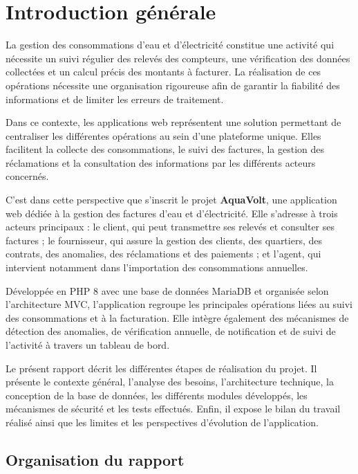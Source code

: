 
\chapter*{Introduction générale}

La gestion des consommations d'eau et d'électricité constitue une activité qui nécessite un suivi régulier des relevés des compteurs, une vérification des données collectées et un calcul précis des montants à facturer. La réalisation de ces opérations nécessite une organisation rigoureuse afin de garantir la fiabilité des informations et de limiter les erreurs de traitement.

Dans ce contexte, les applications web représentent une solution permettant de centraliser les différentes opérations au sein d'une plateforme unique. Elles facilitent la collecte des consommations, le suivi des factures, la gestion des réclamations et la consultation des informations par les différents acteurs concernés.

C'est dans cette perspective que s'inscrit le projet \textbf{AquaVolt}, une application web dédiée à la gestion des factures d'eau et d'électricité. Elle s'adresse à trois acteurs principaux : le client, qui peut transmettre ses relevés et consulter ses factures ; le fournisseur, qui assure la gestion des clients, des quartiers, des contrats, des anomalies, des réclamations et des paiements ; et l'agent, qui intervient notamment dans l'importation des consommations annuelles.

Développée en PHP 8 avec une base de données MariaDB et organisée selon l'architecture MVC, l'application regroupe les principales opérations liées au suivi des consommations et à la facturation. Elle intègre également des mécanismes de détection des anomalies, de vérification annuelle, de notification et de suivi de l'activité à travers un tableau de bord.

Le présent rapport décrit les différentes étapes de réalisation du projet. Il présente le contexte général, l'analyse des besoins, l'architecture technique, la conception de la base de données, les différents modules développés, les mécanismes de sécurité et les tests effectués. Enfin, il expose le bilan du travail réalisé ainsi que les limites et les perspectives d'évolution de l'application.

\section*{Organisation du rapport}

